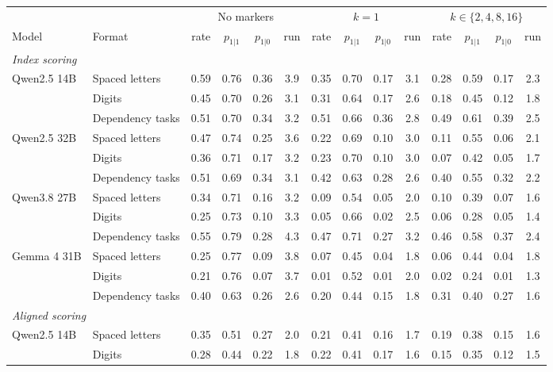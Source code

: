 \begin{tabular}{ll cccc cccc cccc}
\toprule
& & \multicolumn{4}{c}{No markers} & \multicolumn{4}{c}{$k = 1$} & \multicolumn{4}{c}{$k \in \{2,4,8,16\}$} \\
\cmidrule(lr){3-6}\cmidrule(lr){7-10}\cmidrule(lr){11-14}
Model & Format & rate & $p_{1|1}$ & $p_{1|0}$ & run & rate & $p_{1|1}$ & $p_{1|0}$ & run & rate & $p_{1|1}$ & $p_{1|0}$ & run \\
\midrule
\multicolumn{14}{l}{\emph{Index scoring}} \\
Qwen2.5 14B & Spaced letters & 0.59 & 0.76 & 0.36 & 3.9 & 0.35 & 0.70 & 0.17 & 3.1 & 0.28 & 0.59 & 0.17 & 2.3 \\
 & Digits & 0.45 & 0.70 & 0.26 & 3.1 & 0.31 & 0.64 & 0.17 & 2.6 & 0.18 & 0.45 & 0.12 & 1.8 \\
 & Dependency tasks & 0.51 & 0.70 & 0.34 & 3.2 & 0.51 & 0.66 & 0.36 & 2.8 & 0.49 & 0.61 & 0.39 & 2.5 \\
Qwen2.5 32B & Spaced letters & 0.47 & 0.74 & 0.25 & 3.6 & 0.22 & 0.69 & 0.10 & 3.0 & 0.11 & 0.55 & 0.06 & 2.1 \\
 & Digits & 0.36 & 0.71 & 0.17 & 3.2 & 0.23 & 0.70 & 0.10 & 3.0 & 0.07 & 0.42 & 0.05 & 1.7 \\
 & Dependency tasks & 0.51 & 0.69 & 0.34 & 3.1 & 0.42 & 0.63 & 0.28 & 2.6 & 0.40 & 0.55 & 0.32 & 2.2 \\
Qwen3.8 27B & Spaced letters & 0.34 & 0.71 & 0.16 & 3.2 & 0.09 & 0.54 & 0.05 & 2.0 & 0.10 & 0.39 & 0.07 & 1.6 \\
 & Digits & 0.25 & 0.73 & 0.10 & 3.3 & 0.05 & 0.66 & 0.02 & 2.5 & 0.06 & 0.28 & 0.05 & 1.4 \\
 & Dependency tasks & 0.55 & 0.79 & 0.28 & 4.3 & 0.47 & 0.71 & 0.27 & 3.2 & 0.46 & 0.58 & 0.37 & 2.4 \\
Gemma 4 31B & Spaced letters & 0.25 & 0.77 & 0.09 & 3.8 & 0.07 & 0.45 & 0.04 & 1.8 & 0.06 & 0.44 & 0.04 & 1.8 \\
 & Digits & 0.21 & 0.76 & 0.07 & 3.7 & 0.01 & 0.52 & 0.01 & 2.0 & 0.02 & 0.24 & 0.01 & 1.3 \\
 & Dependency tasks & 0.40 & 0.63 & 0.26 & 2.6 & 0.20 & 0.44 & 0.15 & 1.8 & 0.31 & 0.40 & 0.27 & 1.6 \\
\midrule
\multicolumn{14}{l}{\emph{Aligned scoring}} \\
Qwen2.5 14B & Spaced letters & 0.35 & 0.51 & 0.27 & 2.0 & 0.21 & 0.41 & 0.16 & 1.7 & 0.19 & 0.38 & 0.15 & 1.6 \\
 & Digits & 0.28 & 0.44 & 0.22 & 1.8 & 0.22 & 0.41 & 0.17 & 1.6 & 0.15 & 0.35 & 0.12 & 1.5 \\

\end{tabular}
